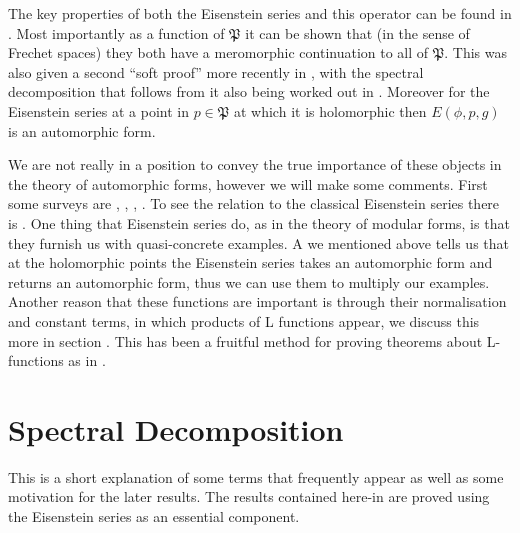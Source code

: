 The key properties of both the Eisenstein series and this operator can be found in \cite[IV.1.8, IV.1.9, IV.1.10, IV.1.11]{moeglinSpectralDecompositionEisenstein1995}. Most importantly as a function of \(\mathfrak{P}\) it can be shown that (in the sense of Frechet spaces) they both have a meromorphic continuation to all of \(\mathfrak{P}\). This was also given a second ``soft proof'' more recently in \cite{bernsteinMeromorphicContinuationEisenstein2022}, with the spectral decomposition that follows from it also being worked out in \cite{delormeSpectralTheoremLanglands2021}. Moreover for the Eisenstein series at a point in \(p\in \mathfrak{P}\) at which it is holomorphic then \(E(\phi,p, g)\) is an automorphic form. 

We are not really in a position to convey the true importance of these objects in the theory of automorphic forms, however we will make some comments. First some surveys are \cite{lapidPerspectivesEisensteinSeries2022}, \cite{arthurEisensteinSeriesTrace1979}, \cite{kimEISENSTEINSERIESTHEIR}, \cite{jiangResiduesEisensteinSeries2008a}. To see the relation to the classical Eisenstein series there is \cite{garrettTransitionEisensteinSeries2016}. One thing that Eisenstein series do, as in the theory of modular forms, is that they furnish us with quasi-concrete examples. A we mentioned above \cite[IV.1.9.(b).i]{moeglinSpectralDecompositionEisenstein1995} tells us that at the holomorphic points the Eisenstein series takes an automorphic form and returns an automorphic form, thus we can use them to multiply our examples. Another reason that these functions are important is through their normalisation and constant terms, in which products of L functions appear, we discuss this more in section . This has been a fruitful method for proving theorems about L-functions as in \cite{shahidiEisensteinSeriesAutomorphic2010}\cite{pollackRANKINSELBERGMETHODUSER}\cite{arthurEisensteinSeriesTrace1979}.

\section{Spectral Decomposition}\label{spectral_decomposition}
This is a short explanation of some terms that frequently appear as well as some motivation for the later results. The results contained here-in are proved using the Eisenstein series as an essential component. 

